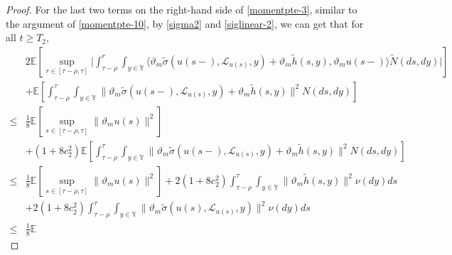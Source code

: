 \documentclass[11pt]{article}
\numberwithin{equation}{section}
\theoremstyle{plain}
\begin{document}
\begin{proof}
 For the last two terms on the right-hand side of \eqref{momentpte-3},
 similar to the argument of \eqref{momentpte-10}, 
 by \eqref{sigma2} and \eqref{siglinear-2}, 
 we can get that for all $t \ge T_2$,
 \begin{align}\label{momentpte-11}
       & 2 \mathbb{E}
               \left[ \sup_{r\in [\tau-\rho,\tau]}
                         \Big| \int_{\tau-\rho}^{r}
                                      \int_{y \in \mathbb{Y} }
                                        \langle \vartheta_m \widetilde{\sigma}(u(s-), \mathcal{L}_{u(s)}, y) 
                                                    + \vartheta_m \widetilde{h}(s, y),
                                                    \vartheta_m u(s-)
                                        \rangle \widetilde{N}(ds,dy)
                         \Big|
              \right]  \nonumber\\
       & + \mathbb{E}
               \left[ \int_{\tau-\rho}^{\tau}
                             \int_{y \in \mathbb{Y} }
                            \| \vartheta_m \widetilde{\sigma}(u(s-), \mathcal{L}_{u(s)}, y) 
                               + \vartheta_m \widetilde{h}(s, y) \|^2 N(ds,dy)
               \right] \nonumber\\
  \le &  \frac{1}{8} \mathbb{E}
              \left[ \sup_{s \in [\tau-\rho,\tau]} \|\vartheta_m u(s)\|^2 \right]
                   \nonumber\\
       & + (1 + 8c_2^2) \mathbb{E}
                           \left[ \int_{\tau-\rho}^{\tau}
                                         \int_{y \in \mathbb{Y} }
                                        \| \vartheta_m \widetilde{\sigma}(u(s-), \mathcal{L}_{u(s)}, y) 
                                           + \vartheta_m \widetilde{h}(s, y) \|^2 N(ds,dy)
                           \right] \nonumber\\                
   \le & \frac{1}{8} \mathbb{E}
                 \left[ \sup_{s \in [\tau-\rho,\tau]} \|\vartheta_m u(s)\|^2 \right]
           + 2 (1 + 8c_2^2) 
               \int_{\tau-\rho}^{\tau}
                   \int_{y \in \mathbb{Y} }
                           \| \vartheta_m \widetilde{h}(s, y) \|^2  \nu(dy) ds  \nonumber\\
        &  + 2 (1 + 8c_2^2) 
                        \int_{\tau-\rho}^{\tau}
                            \int_{y \in \mathbb{Y} }
                                \|\vartheta_m \widetilde{\sigma}(u(s), \mathcal{L}_{u(s)}, y) \| ^2 \nu(dy)  ds \nonumber\\
  \le & \frac{1}{8} \mathbb{E}

\end{align}
\end{proof}
\end{document}

